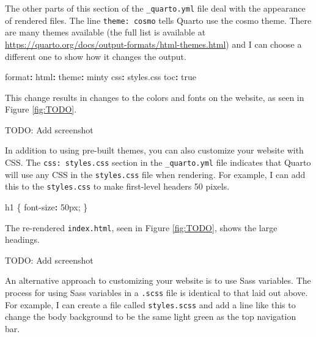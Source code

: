 \documentclass[
]{book}
\newenvironment{Shaded}{\begin{snugshade}}{\end{snugshade}}
\newcommand{\AttributeTok}[1]{\textcolor[rgb]{0.77,0.63,0.00}{#1}}
\newcommand{\CharTok}[1]{\textcolor[rgb]{0.31,0.60,0.02}{#1}}
\newcommand{\CommentTok}[1]{\textcolor[rgb]{0.56,0.35,0.01}{\textit{#1}}}
\newcommand{\FunctionTok}[1]{\textcolor[rgb]{0.00,0.00,0.00}{#1}}
\newcommand{\KeywordTok}[1]{\textcolor[rgb]{0.13,0.29,0.53}{\textbf{#1}}}
\begin{document}
The other parts of this section of the \texttt{\_quarto.yml} file deal with the appearance of rendered files. The line \texttt{theme:\ cosmo} tells Quarto use the cosmo theme. There are many themes available (the full list is available at \url{https://quarto.org/docs/output-formats/html-themes.html}) and I can choose a different one to show how it changes the output.

\begin{Shaded}
\begin{Highlighting}[]
\FunctionTok{format}\KeywordTok{:}
\AttributeTok{  }\FunctionTok{html}\KeywordTok{:}
\AttributeTok{    }\FunctionTok{theme}\KeywordTok{:}\AttributeTok{ minty}
\AttributeTok{    }\FunctionTok{css}\KeywordTok{:}\AttributeTok{ styles.css}
\AttributeTok{    }\FunctionTok{toc}\KeywordTok{:}\AttributeTok{ }\CharTok{true}
\end{Highlighting}
\end{Shaded}

This change results in changes to the colors and fonts on the website, as seen in Figure \ref{fig:TODO}.

TODO: Add screenshot

In addition to using pre-built themes, you can also customize your website with CSS. The \texttt{css:\ styles.css} section in the \texttt{\_quarto.yml} file indicates that Quarto will use any CSS in the \texttt{styles.css} file when rendering. For example, I can add this to the \texttt{styles.css} to make first-level headers 50 pixels.

\begin{Shaded}
\begin{Highlighting}[]
\AttributeTok{h1 \{}
\AttributeTok{  }\FunctionTok{font{-}size}\KeywordTok{:}\AttributeTok{ 50px;}
\AttributeTok{\}}
\end{Highlighting}
\end{Shaded}

The re-rendered \texttt{index.html}, seen in Figure \ref{fig:TODO}, shows the large headings.

TODO: Add screenshot

An alternative approach to customizing your website is to use Sass variables. The process for using Sass variables in a \texttt{.scss} file is identical to that laid out above. For example, I can create a file called \texttt{styles.scss} and add a line like this to change the body background to be the same light green as the top navigation bar.

\begin{Shaded}
\end{Shaded}
\end{document}
